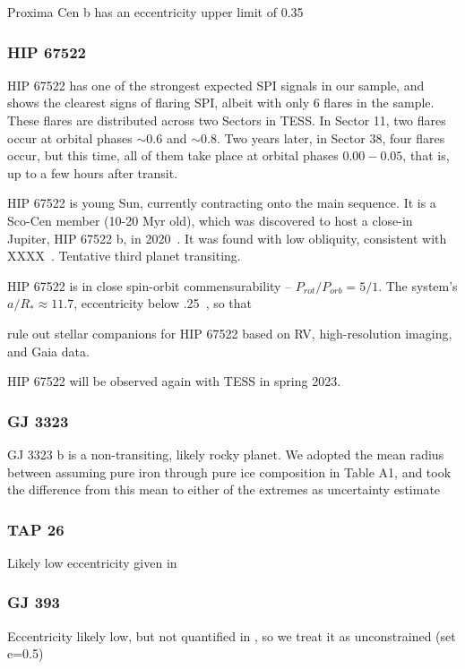 \documentclass[twocolumn]{aastex631}
\begin{document}
Proxima Cen b has an eccentricity upper limit of 0.35~\cite{anglada-escude2016terrestrial}

\subsubsection{HIP 67522}
HIP 67522 has one of the strongest expected SPI signals in our sample, and shows the clearest signs of flaring SPI, albeit with only 6 flares in the sample. These flares are distributed across two Sectors in TESS. In Sector 11, two flares occur at orbital phases $\sim 0.6$ and $\sim 0.8$. Two years later, in Sector 38, four flares occur, but this time, all of them take place at orbital phases $0.00-0.05$, that is, up to a few hours after transit.

HIP 67522 is young Sun, currently contracting onto the main sequence. It is a Sco-Cen member (10-20 Myr old), which was discovered to host a close-in Jupiter, HIP 67522 b, in 2020~\citep{rizzuto2020tess}. It was found with low obliquity, consistent with XXXX~\citep{heitzmann2021obliquity}. Tentative third planet transiting.

HIP 67522 is in close spin-orbit commensurability -- $P_{rot}/P_{orb}=5/1$. The system's $a/R_*\approx11.7$, eccentricity below .25~\cite{rizzuto2020tess}, so that  

\cite{wood2021characterizing} rule out stellar companions for HIP 67522 based on RV, high-resolution imaging, and Gaia data.

HIP 67522 will be observed again with TESS in spring 2023.
\subsubsection{GJ 3323}

GJ 3323 b is a non-transiting, likely rocky planet. We adopted the mean radius between assuming pure iron through pure ice composition in \cite{lovos2022null} Table A1, and took the difference from this mean to either of the extremes as uncertainty estimate



\subsubsection{TAP 26}
Likely low eccentricity given in \cite{yu2017hot}

\subsubsection{GJ 393}
Eccentricity likely low, but not quantified in \cite{amado2021carmenes}, so we treat it as unconstrained (set e=0.5)
\end{document}
